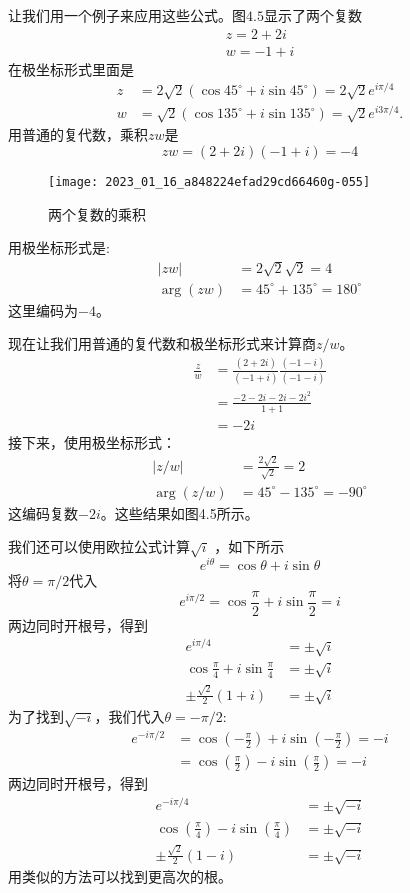让我们用一个例子来应用这些公式。图$4.5$显示了两个复数
$$
\begin{gathered}
z=2+2 i \\
w=-1+i
\end{gathered}
$$
在极坐标形式里面是
$$
\begin{aligned}
z & =2 \sqrt{2}\left(\cos 45^{\circ}+i \sin 45^{\circ}\right)=2 \sqrt{2} e^{i \pi / 4} \\
w & =\sqrt{2}\left(\cos 135^{\circ}+i \sin 135^{\circ}\right)=\sqrt{2} e^{i 3 \pi / 4} .
\end{aligned}
$$
用普通的复代数，乘积$z w$是
$$
z w=(2+2 i)(-1+i)=-4
$$
\begin{figure}[h!]
    \centering
    \texttt{[image: 2023\_01\_16\_a848224efad29cd66460g-055]}
    \caption[short]{两个复数的乘积}
\end{figure}
用极坐标形式是:
$$
\begin{aligned}
|z w| & =2 \sqrt{2} \sqrt{2}=4 \\
\arg (z w) & =45^{\circ}+135^{\circ}=180^{\circ}
\end{aligned}
$$
这里编码为$-4$。

现在让我们用普通的复代数和极坐标形式来计算商$z / w$。
$$
\begin{aligned}
\frac{z}{w} & =\frac{(2+2 i)}{(-1+i)} \frac{(-1-i)}{(-1-i)} \\
& =\frac{-2-2 i-2 i-2 i^{2}}{1+1} \\
& =-2 i
\end{aligned}
$$
接下来，使用极坐标形式：
$$
\begin{aligned}
|z / w| & =\frac{2 \sqrt{2}}{\sqrt{2}}=2 \\
\arg (z / w) & =45^{\circ}-135^{\circ}=-90^{\circ}
\end{aligned}
$$
这编码复数$-2 i$。这些结果如图4.5所示。

我们还可以使用欧拉公式计算$\sqrt{i}$ ，如下所示
$$
e^{i \theta}=\cos \theta+i \sin \theta
$$
将$\theta=\pi / 2$代入
$$
e^{i \pi / 2}=\cos \frac{\pi}{2}+i \sin \frac{\pi}{2}=i
$$
两边同时开根号，得到
$$
\begin{aligned}
e^{i \pi / 4} & =\pm \sqrt{i} \\
\cos \frac{\pi}{4}+i \sin \frac{\pi}{4} & =\pm \sqrt{i} \\
\pm \frac{\sqrt{2}}{2}(1+i) & =\pm \sqrt{i}
\end{aligned}
$$
为了找到$\sqrt{-i}$，我们代入$\theta=-\pi / 2$:
$$
\begin{aligned}
e^{-i \pi / 2} & =\cos \left(-\frac{\pi}{2}\right)+i \sin \left(-\frac{\pi}{2}\right)=-i \\
& =\cos \left(\frac{\pi}{2}\right)-i \sin \left(\frac{\pi}{2}\right)=-i
\end{aligned}
$$
两边同时开根号，得到
$$
\begin{aligned}
e^{-i \pi / 4} & =\pm \sqrt{-i} \\
\cos \left(\frac{\pi}{4}\right)-i \sin \left(\frac{\pi}{4}\right) & =\pm \sqrt{-i} \\
\pm \frac{\sqrt{2}}{2}(1-i) & =\pm \sqrt{-i}
\end{aligned}
$$
用类似的方法可以找到更高次的根。

